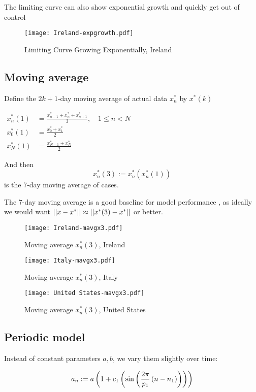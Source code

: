 The limiting curve can also show exponential growth and quickly get out of control

\begin{figure}[H]
\texttt{[image: Ireland-expgrowth.pdf]}
\endminipage 
\caption{Limiting Curve Growing Exponentially, Ireland}
\end{figure}

\subsection{Moving average}

Define the $2k+1$-day moving average of actual data $x_n^*$ by $x^*(k)$

$\begin{aligned}
x^*_n(1) &=\frac{x^*_{n-1} + x^*_n + x^*_{n+1}}{3},\quad 1\leq n < N \\
x^*_0(1) &=\frac{x^*_0 + x^*_1}{2}\\
x^*_N(1) &=\frac{x^*_{N-1} + x^*_N}{2}
\end{aligned}$

And then $$x_n^*(3):= x^*_n(x^*_n(1))$$ is the 7-day moving average of cases.

The 7-day moving average is a good baseline for model performance , as ideally we would want $\left|\left|x-x^*\right|\right|\approx\left|\left|x^*(3)-x^*\right|\right|$ or better.

\begin{figure}[H]
\texttt{[image: Ireland-mavgx3.pdf]}
\caption{Moving average $x^*_n(3)$, Ireland}
\endminipage 
{}
\texttt{[image: Italy-mavgx3.pdf]}
\caption{Moving average $x^*_n(3)$, Italy}
\endminipage 
{}
\texttt{[image: United States-mavgx3.pdf]}
\caption{Moving average $x^*_n(3)$, United States}
\endminipage 
\end{figure}

\subsection{Periodic model}\label{ch:periodic}

Instead of constant parameters $a,b$, we vary them slightly over time:

\begin{equation} \label{eq:anper}
a_n := a\left(1+c_1\left(\sin\left(\frac{2\pi}{p_1}\left(n-n_1\right)\right)\right)\right)
\end{equation}

